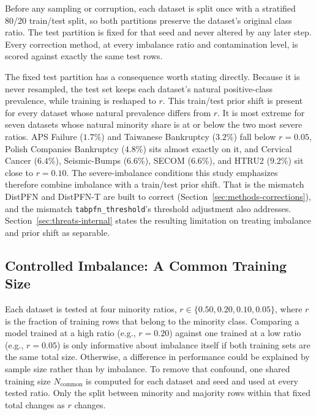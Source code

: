Before any sampling or corruption, each dataset is split once with a
stratified 80/20 train/test split, so both partitions preserve the dataset's
original class ratio. The test partition is fixed for that seed and never
altered by any later step. Every correction method, at every imbalance ratio
and contamination level, is scored against exactly the same test rows.

The fixed test partition has a consequence worth stating directly. Because it is never resampled, the test set keeps each dataset's natural positive-class prevalence, while training is reshaped to $r$. This train/test prior shift is present for every dataset whose natural prevalence differs from $r$. It is most extreme for seven datasets whose natural minority share is at or below the two most severe ratios. APS Failure ($1.7\%$) and Taiwanese Bankruptcy ($3.2\%$) fall below $r{=}0.05$, Polish Companies Bankruptcy ($4.8\%$) sits almost exactly on it, and Cervical Cancer ($6.4\%$), Seismic-Bumps ($6.6\%$), SECOM ($6.6\%$), and HTRU2 ($9.2\%$) sit close to $r{=}0.10$. The severe-imbalance conditions this study emphasizes therefore combine imbalance with a train/test prior shift. That is the mismatch DistPFN and DistPFN-T are built to correct (Section~\ref{sec:methods-corrections}), and the mismatch \texttt{tabpfn\_threshold}'s threshold adjustment also addresses. Section~\ref{sec:threats-internal} states the resulting limitation on treating imbalance and prior shift as separable.

\subsection{Controlled Imbalance: A Common Training Size}
\label{sec:methods-ncommon}

Each dataset is tested at four minority ratios, $r \in \{0.50, 0.20, 0.10,
0.05\}$, where $r$ is the fraction of training rows that belong to the
minority class. Comparing a model trained at a high ratio (e.g., $r{=}0.20$)
against one trained at a low ratio (e.g., $r{=}0.05$) is only informative
about imbalance itself if both training sets are the same total size.
Otherwise, a difference in performance could be explained by sample size
rather than by imbalance. To remove that confound, one shared training size
$N_{\text{common}}$ is computed for each dataset and seed and used at every
tested ratio. Only the split between minority and majority rows within that
fixed total changes as $r$ changes.

